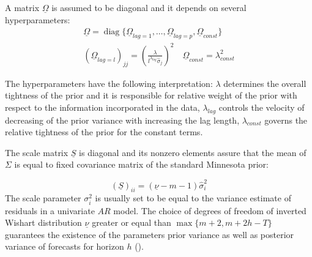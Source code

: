 \documentclass[11pt]{article} %
\DeclareMathOperator{\diag}{diag}
\newcommand{\prior}{\underline}
\begin{document}
A matrix $\prior \Omega$  is assumed to be diagonal and it depends on several hyperparameters:
\begin{gather}
\prior \Omega=\diag\lbrace{\prior \Omega_{lag=1},\ldots, \prior \Omega_{lag=p},\prior \Omega_{const} \rbrace}\\ 
(\prior \Omega_{lag=l})_{jj} 
=\left(\frac{\lambda}{l^{\lambda_{lag}}\hat\sigma_j}\right)^2
\quad
\prior \Omega_{const}=\lambda_{const}^2 \label{prior_omega2}
\end{gather}

The  hyperparameters have the following interpretation: $\lambda$ determines the overall tightness of the prior and it is responsible for relative weight of the prior with respect to the information incorporated in the data, $\lambda_{lag}$  controls the velocity of decreasing of the prior variance with increasing the lag length, $\lambda_{const}$ governs the relative tightness of the prior for the constant terms.
 
The scale matrix $\prior S$ is diagonal and its nonzero elements assure that the mean of $\Sigma$ is equal to fixed covariance matrix of the standard Minnesota prior: 

\begin{equation}
(\prior S)_{ii}= (\prior \nu- m- 1) \hat\sigma^2_{i}
\end{equation}
The scale parameter $\sigma^2_{i}$ is usually set to be equal to the variance estimate of residuals in a univariate $AR$ model.
The choice of degrees of freedom of inverted Wishart distribution  $\prior\nu$  greater or equal than $\max\lbrace m+2, m+2h-T\rbrace$ guarantees the existence of the parameters prior variance as well as posterior variance of forecasts for horizon $h$ (\cite{kadiyala_karlsson_1997}).
\end{document}
